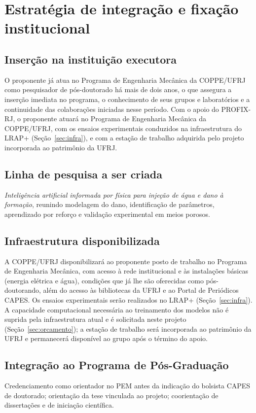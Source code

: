 \documentclass[10pt,a4paper]{article}
\newcommand{\itemedital}[1]{}
\begin{document}
\section{Estratégia de integração e fixação institucional}\itemedital{2.17; 1.4}

\subsection{Inserção na instituição executora}
O proponente já atua no Programa de Engenharia Mecânica da COPPE/UFRJ como pesquisador de
pós-doutorado há mais de dois anos, o que assegura a inserção imediata no programa, o
conhecimento de seus grupos e laboratórios e a continuidade das colaborações iniciadas
nesse período. Com o apoio do PROFIX-RJ, o proponente atuará no Programa de
        Engenharia Mecânica da COPPE/UFRJ, com os ensaios experimentais conduzidos na
        infraestrutura do LRAP+ (Seção~\ref{sec:infra}), e com a estação de trabalho
        adquirida pelo projeto incorporada ao patrimônio da UFRJ.

\subsection{Linha de pesquisa a ser criada}
\textit{Inteligência artificial informada por
        física para injeção de água e dano à formação}, reunindo modelagem do dano, identificação
        de parâmetros, aprendizado por reforço e validação experimental em meios porosos.

\subsection{Infraestrutura disponibilizada}
A COPPE/UFRJ disponibilizará ao proponente posto de trabalho no Programa de Engenharia
Mecânica, com acesso à rede institucional e às instalações básicas (energia elétrica e
água), condições que já lhe são oferecidas como pós-doutorando, além do acesso às
bibliotecas da UFRJ e ao Portal de Periódicos CAPES. Os ensaios experimentais serão
realizados no LRAP+ (Seção~\ref{sec:infra}). A capacidade computacional necessária ao
treinamento dos modelos não é suprida pela infraestrutura atual e é solicitada neste
projeto (Seção~\ref{sec:orcamento}); a estação de trabalho será incorporada ao patrimônio
da UFRJ e permanecerá disponível ao grupo após o término do apoio.

\subsection{Integração ao Programa de Pós-Graduação}
Credenciamento como orientador no PEM antes da indicação do
        bolsista CAPES de doutorado; orientação da tese vinculada ao projeto; coorientação de
        dissertações e de iniciação científica.
\end{document}
